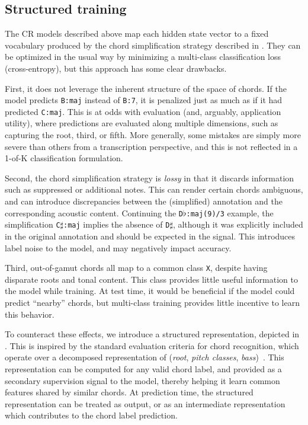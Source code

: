 \documentclass{article}
\begin{document}
\subsection{Structured training}
\label{sec:encoding}

The CR models described above map each hidden state vector to a fixed vocabulary produced by the chord simplification strategy described in .
They can be optimized in the usual way by minimizing a multi-class classification loss (cross-entropy), but this approach has some clear drawbacks.

First, it does not leverage the inherent structure of the space of chords.
If the model predicts \texttt{B:maj} instead of \texttt{B:7}, it is penalized just as much as if it had predicted \texttt{C:maj}.
This is at odds with evaluation (and, arguably, application utility), where predictions are evaluated along multiple dimensions, such as capturing the root, third, or fifth.
More generally, some mistakes are simply more severe than others from a transcription perspective, and this is not reflected in a 1-of-K classification formulation.

Second, the chord simplification strategy is \emph{lossy} in that it discards information such as suppressed or additional notes.
This can render certain chords ambiguous, and can introduce discrepancies between the (simplified) annotation and the corresponding acoustic content.
Continuing the \texttt{D}$\flat$\texttt{:maj{(9)}/3} example, the simplification \texttt{C}$\sharp$\texttt{:maj} implies the absence of \texttt{D}$\sharp$, although it was explicitly included in the original annotation and should be expected in the signal.
This introduces label noise to the model, and may negatively impact accuracy.

Third, out-of-gamut chords all map to a common class \texttt{X}, despite having disparate roots and tonal content.
This class provides little useful information to the model while training.
At test time, it would be beneficial if the model could predict ``nearby'' chords, but multi-class training provides little incentive to learn this behavior.


To counteract these effects, we introduce a structured representation, depicted in .
This is inspired by the standard evaluation criteria for chord recognition, which operate over a decomposed representation of (\emph{root}, \emph{pitch classes}, \emph{bass})~\cite{raffel2014mir_eval}.
This representation can be computed for any valid chord label, and provided as a secondary supervision signal to the model, thereby helping it learn common features shared by similar chords.
At prediction time, the structured representation can be treated as output, or as an intermediate representation which contributes to the chord label prediction.
\end{document}
